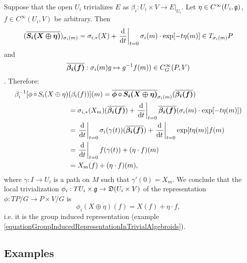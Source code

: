 \begin{example}[Local trivialization of representation of $TP/G$ on $E = P \times V/G$]\label{localTrivializationOfRepresentationOfAtiyahTPGonAssociated}
\label{exampleLocalTrivializationOfGroupInducedRepresentationOfAtiyahLieAlgebroidAction}
Suppose that the open $U_i$ trivializes $E$ as $\beta_i: U_i \times V\to E|_{U_i}$. Let $\eta \in C^\infty(U_i, \mathfrak{g})$, $f \in C^\infty(U_i, V)$ be arbitrary. Then
$$(\upsect{S_i(X \oplus \eta)})_{\sigma_i(m)} = \sigma_{i, *}(X) + \der{t}[t=0]{\sigma_i(m) \cdot \exp[-t \eta(m)]} \in T_{\sigma_i(m)} P$$
and
$$\overline{\bm{\beta_i(f)}}: \sigma_i(m)g \mapsto g^{-1} f(m)) \in C^\infty_G(P, V)$$.
Therefore:
\begin{align*}
    \beta_i^{-1}[\phi\comp S_i(X \oplus \eta)&(\beta_i(f))] (m)
        = \upsect{\phi \comp S_i(X \oplus \eta)}_{\sigma_i(m)} (\upsect{\beta_i(f)})\\
        &= \sigma_{i, *}(X_m)(\upsect{\beta_i(f)}) 
        + \der{t}[t = 0]{\upsect{\beta_i(f)}(\sigma_i(m) \cdot \exp[-t \eta(m)])}\\
        &= \der{t}[t = 0]{\sigma_i(\gamma(t))} (\upsect{\beta_i(f)}) + \der{t}[t=0]{\exp[t \eta(m)] f(m)}\\
        &= \der{t}[t=0]{f(\gamma(t))} + (\eta \cdot f)(m)\\
        &= X_m(f) + (\eta \cdot f)(m),
\end{align*}
where $\gamma: I \to U_i$ is a path on $M$ such that $\gamma'(0) = X_m$. We conclude that the local trivialization $\phi_i: TU_i \times \alg g \to \alg D(U_i \times V)$ of the representation $\phi: TP/G \to P \times V/G$ is
\begin{equation}\label{equationLocalRepresentationAtiyahLieAlgebroidOnAssociatedVectorBundleExpectedTrivialALgebroidRepresentationActionOfGroup}
    \phi_i(X \oplus \eta)(f) = X(f) + \eta \cdot f,
\end{equation}
i.e. it is the group induced representation (example \ref{equationGroupInducedRepresentationInTrivialAlgebroids}).
\end{example}




\subsection{Examples}

